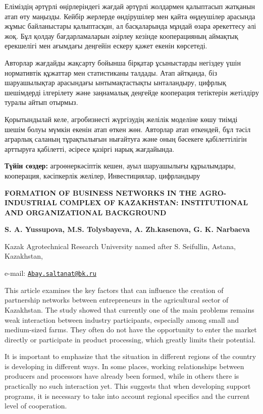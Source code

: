 Еліміздің әртүрлі өңірлеріндегі жағдай әртүрлі жолдармен қалыптасып
жатқанын атап өту маңызды. Кейбір жерлерде өндірушілер мен қайта
өңдеушілер арасында жұмыс байланыстары қалыптасқан, ал басқаларында
мұндай өзара әрекеттесу әлі жоқ. Бұл қолдау бағдарламаларын әзірлеу
кезінде кооперацияның аймақтық ерекшелігі мен ағымдағы деңгейін ескеру
қажет екенін көрсетеді.

Авторлар жағдайды жақсарту бойынша бірқатар ұсыныстарды негіздеу үшін
нормативтік құжаттар мен статистиканы талдады. Атап айтқанда, біз
шаруашылықтар арасындағы ынтымақтастықты ынталандыру, цифрлық шешімдерді
ілгерілету және заңнамалық деңгейде кооперация тетіктерін жетілдіру
туралы айтып отырмыз.

Қорытындылай келе, агробизнесті жүргізудің желілік моделіне көшу тиімді
шешім болуы мүмкін екенін атап өткен жөн. Авторлар атап өткендей, бұл
тәсіл аграрлық саланың тұрақтылығын нығайтуға және оның бәсекеге
қабілеттілігін арттыруға қабілетті, әсіресе қазіргі нарық жағдайында.

{\bfseries Түйін сөздер:} агроөнеркәсіптік кешен, ауыл шаруашылығы
құрылымдары, кооперация, кәсіпкерлік желілер, Инвестициялар, цифрландыру

{\bfseries FORMATION OF BUSINESS NETWORKS IN THE AGRO-INDUSTRIAL COMPLEX OF
KAZAKHSTAN: INSTITUTIONAL AND ORGANIZATIONAL BACKGROUND}

{\bfseries S. A. Yussupova, M.S. Tolysbayeva, A. Zh.kasenova, G. K.
Narbaeva}

Kazak Agrotechnical Research University named after S. Seifullin,
Astana, Kazakhstan,

e-mail:
\href{mailto:Abay.saltanat@bk.ru}{\nolinkurl{Abay.saltanat@bk.ru}}

This article examines the key factors that can influence the creation of
partnership networks between entrepreneurs in the agricultural sector of
Kazakhstan. The study showed that currently one of the main problems
remains weak interaction between industry participants, especially among
small and medium-sized farms. They often do not have the opportunity to
enter the market directly or participate in product processing, which
greatly limits their potential.

It is important to emphasize that the situation in different regions of
the country is developing in different ways. In some places, working
relationships between producers and processors have already been formed,
while in others there is practically no such interaction yet. This
suggests that when developing support programs, it is necessary to take
into account regional specifics and the current level of cooperation.

